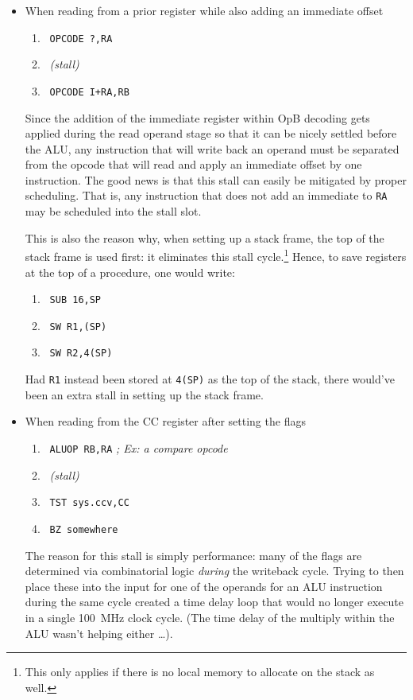 \documentclass{gqtekspec}
\begin{document}
\begin{itemize}
\item When reading from a prior register while also adding an immediate offset
\begin{enumerate}
\item\ {\tt OPCODE ?,RA}
\item\ {\em (stall)}
\item\ {\tt OPCODE I+RA,RB}
\end{enumerate}

	Since the addition of the immediate register within OpB decoding gets
	applied during the read operand stage so that it can be nicely settled
	before the ALU, any instruction that will write back an operand must
	be separated from the opcode that will read and apply an immediate
	offset by one instruction.  The good news is that this stall can
	easily be mitigated by proper scheduling.  That is, any instruction
	that does not add an immediate to {\tt RA} may be scheduled into the
	stall slot.

	This is also the reason why, when setting up a stack frame, the top
	of the stack frame is used first: it eliminates this stall
	cycle.\footnote{This only applies if there is no local memory to
	allocate on the stack as well.}  Hence, to save registers at the top
	of a procedure, one would write:
\begin{enumerate}
\item\ {\tt SUB 16,SP}
\item\ {\tt SW R1,(SP)}
\item\ {\tt SW R2,4(SP)}
\end{enumerate}
	Had {\tt R1} instead been stored at {\tt 4(SP)} as the top of the stack,
	there would've been an extra stall in setting up the stack frame.

\item When reading from the CC register after setting the flags
\begin{enumerate}
\item\ {\tt ALUOP RB,RA} {\em ; Ex: a compare opcode}
\item\ {\em (stall)}
\item\ {\tt TST sys.ccv,CC}
\item\ {\tt BZ somewhere}
\end{enumerate}

	The reason for this stall is simply performance: many of the flags are
	determined via combinatorial logic {\em during} the writeback cycle.
	Trying to then place these into the input for one of the operands for an
	ALU instruction during the same cycle
	created a time delay loop that would no longer execute in a single
	100~MHz clock cycle.  (The time delay of the multiply within the ALU
	wasn't helping either \ldots). 


\end{itemize}
\end{document}
